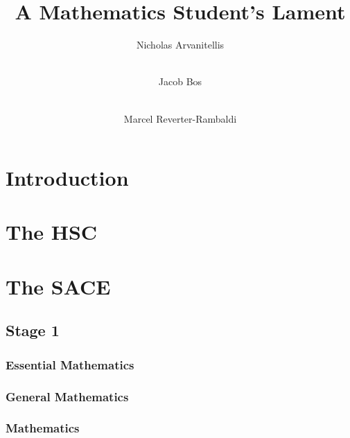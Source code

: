 \documentclass[11pt]{report}
\title{A Mathematics Student's Lament}
\author[1]{Nicholas Arvanitellis}
\author[2]{\\Jacob Bos}
\author[3]{\\Marcel Reverter-Rambaldi}
\affil[1,2,3]{Australian National University}
\affil[3]{The University of Queensland}
\begin{document}
    \maketitle
    \tableofcontents
\newpage
{}

\chapter{Introduction}




\chapter{The HSC}




\chapter{The SACE}

\section{Stage 1}
\subsection{Essential Mathematics}
\subsection{General Mathematics}
\subsection{Mathematics}
\end{document}
